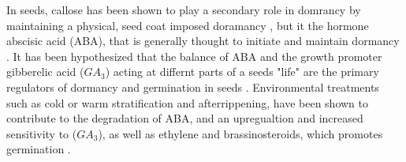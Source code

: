 \documentclass{article}\usepackage[]{graphicx}\usepackage[]{color}
\begin{document}
\par In seeds, callose has been shown to play a secondary role in domrancy by maintaining a physical, seed coat imposed doramancy \citep{Leubner2003}, but it the hormone abscisic acid (ABA), that is generally thought to initiate and maintain dormancy \citep{Baskin2014, Fenner2000}. It has been hypothesized that the balance of ABA and the growth promoter gibberelic acid ($GA_3$) acting at differnt parts of a seeds "life" are the primary regulators of dormancy and germination in seeds \citep{Leubner2003,Kucera2005}. Environmental treatments such as cold or warm stratification and afterrippening, have been shown to contribute to the degradation of ABA, and an upregualtion and increased sensitivity to ($GA_3$), as well as ethylene and brassinosteroids, which promotes germination \citep{Kucera2005}.
\end{document}
